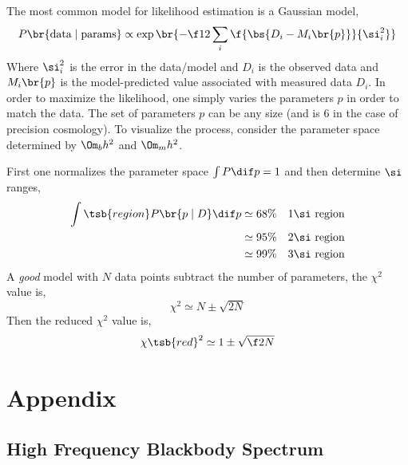 \documentclass{article}
\begin{document}
The most common model for likelihood estimation is a Gaussian model,
\[ P\br{\text{data}\mid\text{params}} \propto \exp\br{-\f12 \sum_i \f{\bs{D_i - M_i\br{p}}}{\si_i^2}} \]
Where $\si_i^2$ is the error in the data/model and $D_i$ is the observed data and $M_i\br{p}$ is the model-predicted value associated with measured data $D_i$. In order to maximize the likelihood, one simply varies the parameters $p$ in order to match the data. The set of parameters $p$ can be any size (and is $6$ in the case of precision cosmology). To visualize the process, consider the parameter space determined by $\Om_b h^2$ and $\Om_m h^2$.
\begin{center}
\end{center}
First one normalizes the parameter space $\int P\dif p = 1$ and then determine $\si$ ranges,
\begin{align*}
    \int\tsb{region} P\br{p \mid D} \dif p
    &\simeq 68\% \quad 1\si \text{ region} \\
    &\simeq 95\% \quad 2\si \text{ region} \\
    &\simeq 99\% \quad 3\si \text{ region} \\
\end{align*}
A \textit{good} model with $N$ data points subtract the number of parameters, the $\chi^2$ value is,
\[ \chi^2 \simeq N \pm \sqrt{2N} \]
Then the reduced $\chi^2$ value is,
\[ \chi\tsb{red}^2 \simeq 1 \pm \sqrt{\f2N} \]

\newpage
\section*{Appendix}
\setcounter{subsection}{0}
\setcounter{subsubsection}{0}
\renewcommand*{\theHsubsection}{appendix.\the\value{subsection}}
\renewcommand{\thesubsection}{\Alph{subsection}}
\subsection{High Frequency Blackbody Spectrum}
\label{sec:upper_black_body}
\end{document}

